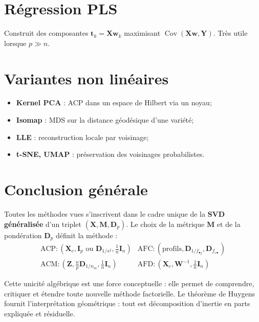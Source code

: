 \documentclass[11pt, a4paper, openany]{book}
\theoremstyle{plain}
\theoremstyle{definition}
\theoremstyle{remark}
\newcommand{\1}{\mathds{1}}
\DeclareMathOperator{\Cov}{Cov}
\newcommand{\X}{\mathbf{X}}
\newcommand{\M}{\mathbf{M}}
\newcommand{\W}{\mathbf{W}}
\newcommand{\Z}{\mathbf{Z}}
\begin{document}
\section{Régression PLS}

Construit des composantes $\mathbf{t}_k = \X \mathbf{w}_k$ maximisant
$\Cov(\X \mathbf{w}, \mathbf{Y})$. Très utile lorsque $p \gg n$.

\section{Variantes non linéaires}

\begin{itemize}
  \item \textbf{Kernel PCA} : ACP dans un espace de Hilbert via un noyau;
  \item \textbf{Isomap} : MDS sur la distance géodésique d'une variété;
  \item \textbf{LLE} : reconstruction locale par voisinage;
  \item \textbf{t-SNE, UMAP} : préservation des voisinages probabilistes.
\end{itemize}

\section{Conclusion générale}

Toutes les méthodes vues s'inscrivent dans le cadre unique de la
\textbf{SVD généralisée} d'un triplet $(\X, \M, \mathbf{D}_p)$. Le choix
de la métrique $\M$ et de la pondération $\mathbf{D}_p$ définit la méthode :
\[
\begin{array}{ll}
\text{ACP} : (\X_c, \mathbf{I}_p \text{ ou } \mathbf{D}_{1/s^2}, \frac{1}{n}\mathbf{I}_n)
& \text{AFC} : (\text{profils}, \mathbf{D}_{1/f_{\bullet j}}, \mathbf{D}_{f_{i\bullet}}) \\
\text{ACM} : (\Z, \frac{n}{p}\mathbf{D}_{1/n_m}, \frac{1}{n}\mathbf{I}_n)
& \text{AFD} : (\X_c, \W^{-1}, \frac{1}{n}\mathbf{I}_n)
\end{array}
\]

Cette unicité algébrique est une force conceptuelle : elle permet de comprendre,
critiquer et étendre toute nouvelle méthode factorielle. Le théorème de Huygens
fournit l'interprétation géométrique : tout est décomposition d'inertie en
parts expliquée et résiduelle.

\backmatter
\end{document}
